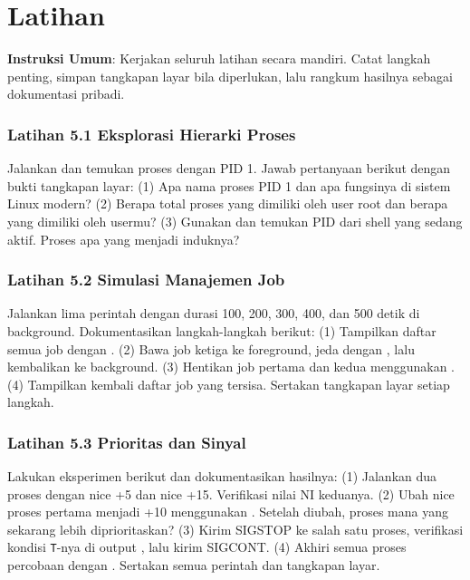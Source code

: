 \section{Latihan}
\label{sec:latihan-proses}

\textbf{Instruksi Umum}: Kerjakan seluruh latihan secara mandiri. Catat langkah penting, simpan tangkapan layar bila diperlukan, lalu rangkum hasilnya sebagai dokumentasi pribadi.

\subsubsection*{Latihan 5.1 Eksplorasi Hierarki Proses}
Jalankan  dan temukan proses dengan PID 1. Jawab pertanyaan berikut
dengan bukti tangkapan layar: (1) Apa nama proses PID 1 dan apa fungsinya di sistem
Linux modern? (2) Berapa total proses yang dimiliki oleh user root dan berapa yang
dimiliki oleh usermu? (3) Gunakan  dan temukan PID dari shell yang sedang
aktif. Proses apa yang menjadi induknya?


\subsubsection*{Latihan 5.2 Simulasi Manajemen Job}
Jalankan lima perintah  dengan durasi 100, 200, 300, 400, dan 500 detik di
background. Dokumentasikan langkah-langkah berikut: (1) Tampilkan daftar semua job
dengan . (2) Bawa job ketiga ke foreground, jeda dengan ,
lalu kembalikan ke background. (3) Hentikan job pertama dan kedua menggunakan .
(4) Tampilkan kembali daftar job yang tersisa. Sertakan tangkapan layar setiap langkah.


\subsubsection*{Latihan 5.3 Prioritas dan Sinyal}
Lakukan eksperimen berikut dan dokumentasikan hasilnya: (1) Jalankan dua proses
 dengan nice +5 dan nice +15. Verifikasi nilai NI keduanya. (2) Ubah nice
proses pertama menjadi +10 menggunakan . Setelah diubah, proses mana yang
sekarang lebih diprioritaskan? (3) Kirim SIGSTOP ke salah satu proses, verifikasi kondisi
\texttt{T}-nya di output , lalu kirim SIGCONT. (4) Akhiri semua proses percobaan
dengan . Sertakan semua perintah dan tangkapan layar.
